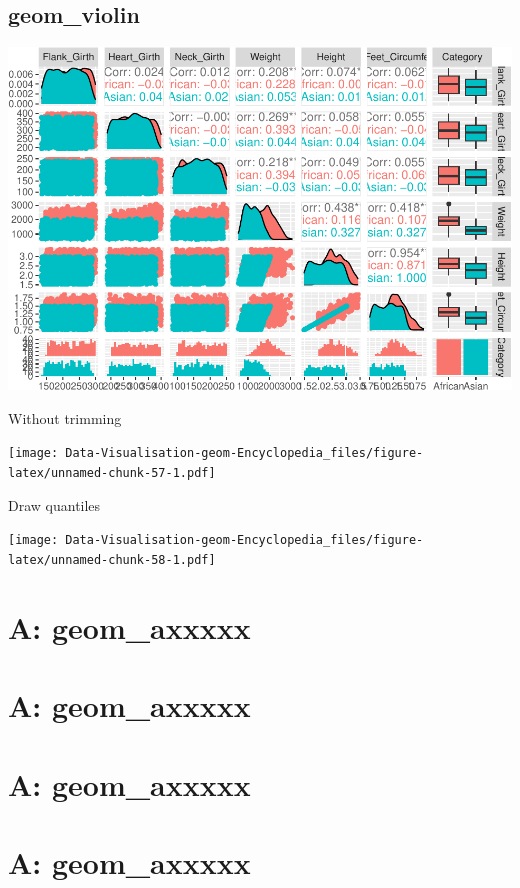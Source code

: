 \documentclass[
]{book}
\begin{document}
\hypertarget{geom_violin}{%
\section{geom\_violin}\label{geom_violin}}

\includegraphics{Data-Visualisation-geom-Encyclopedia_files/figure-latex/unnamed-chunk-56-1.pdf}

Without trimming

\texttt{[image: Data-Visualisation-geom-Encyclopedia\_files/figure-latex/unnamed-chunk-57-1.pdf]}

Draw quantiles

\texttt{[image: Data-Visualisation-geom-Encyclopedia\_files/figure-latex/unnamed-chunk-58-1.pdf]}

\hypertarget{a-geom_axxxxx-9}{%
\chapter{A: geom\_axxxxx}\label{a-geom_axxxxx-9}}

\hypertarget{a-geom_axxxxx-10}{%
\chapter{A: geom\_axxxxx}\label{a-geom_axxxxx-10}}

\hypertarget{a-geom_axxxxx-11}{%
\chapter{A: geom\_axxxxx}\label{a-geom_axxxxx-11}}

\hypertarget{a-geom_axxxxx-12}{%
\chapter{A: geom\_axxxxx}\label{a-geom_axxxxx-12}}
\end{document}
